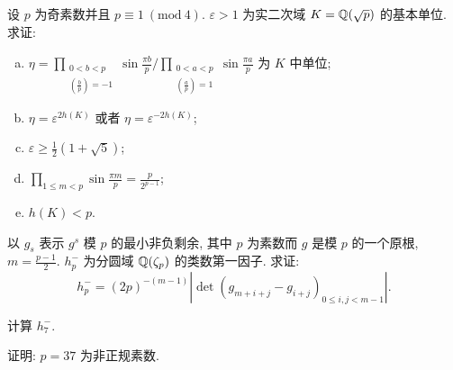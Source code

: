 \begin{Exercises}
\item 设 $p$ 为奇素数并且 $p\equiv 1\ (\mathrm{mod}\ 4)$. $\varepsilon>1$ 为实二次域 $K=\mathbb{Q}(\sqrt{p})$ 的基本单位. 求证:
\begin{enumerate}[(a)]
  \item $\eta=\prod_{\substack{0<b<p\\ \left(\frac{b}{p}\right)=-1}}\sin\frac{\pi b}{p}\Bigg/\prod_{\substack{0<a<p\\ \left(\frac{a}{p}\right)=1}}\sin\frac{\pi a}{p}$ 为 $K$ 中单位;
  \item $\eta=\varepsilon^{2h(K)}$ 或者 $\eta=\varepsilon^{-2h(K)}$;
  \item $\varepsilon\geqslant\frac{1}{2}(1+\sqrt{5})$;
  \item $\prod_{1\leqslant m<p}\sin\frac{\pi m}{p}=\frac{p}{2^{p-1}}$;
  \item $h(K)<p$.
\end{enumerate}

\item 以 $g_s$ 表示 $g^s$ 模 $p$ 的最小非负剩余, 其中 $p$ 为素数而 $g$ 是模 $p$ 的一个原根, $m=\frac{p-1}{2}$. $h_p^-$ 为分圆域 $\mathbb{Q}(\zeta_p)$ 的类数第一因子. 求证:
\[
  h_p^-=(2p)^{-(m-1)}\left|\det\left(g_{m+i+j}-g_{i+j}\right)_{0\leqslant i,j<m-1}\right|.
\]

\item 计算 $h_7^-$.

\item 证明: $p=37$ 为非正规素数.
\end{Exercises}
